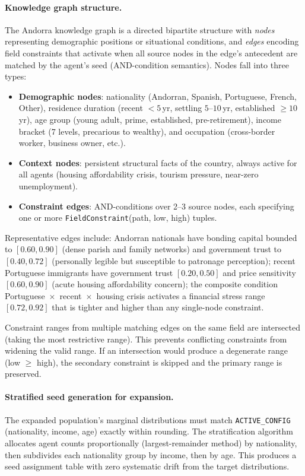 \documentclass[a4paper,12pt]{article}
\begin{document}
\paragraph{Knowledge graph structure.}
The Andorra knowledge graph is a directed bipartite structure with
\emph{nodes} representing demographic positions or situational conditions,
and \emph{edges} encoding field constraints that activate when all source
nodes in the edge's antecedent are matched by the agent's seed
(AND-condition semantics). Nodes fall into three types:

\begin{itemize}
\item \textbf{Demographic nodes}: nationality (Andorran, Spanish, Portuguese,
      French, Other), residence duration (recent $<5$\,yr, settling $5$--$10$\,yr,
      established $\geq10$\,yr), age group (young adult, prime, established,
      pre-retirement), income bracket (7 levels, precarious to wealthy),
      and occupation (cross-border worker, business owner, etc.).
\item \textbf{Context nodes}: persistent structural facts of the country,
      always active for all agents (housing affordability crisis, tourism
      pressure, near-zero unemployment).
\item \textbf{Constraint edges}: AND-conditions over 2--3 source nodes,
      each specifying one or more \texttt{FieldConstraint}(path, low, high)
      tuples.
\end{itemize}

Representative edges include: Andorran nationals have bonding capital
bounded to $[0.60, 0.90]$ (dense parish and family networks) and government
trust to $[0.40, 0.72]$ (personally legible but susceptible to patronage
perception); recent Portuguese immigrants have government trust $[0.20, 0.50]$
and price sensitivity $[0.60, 0.90]$ (acute housing affordability concern);
the composite condition Portuguese~$\times$~recent~$\times$~housing crisis
activates a financial stress range $[0.72, 0.92]$ that is tighter and higher
than any single-node constraint.

Constraint ranges from multiple matching edges on the same field are
intersected (taking the most restrictive range). This prevents conflicting
constraints from widening the valid range. If an intersection would produce
a degenerate range (low $\geq$ high), the secondary constraint is skipped
and the primary range is preserved.

\paragraph{Stratified seed generation for expansion.}
The expanded population's marginal distributions must match \texttt{ACTIVE\_CONFIG}
(nationality, income, age) exactly within rounding. The stratification
algorithm allocates agent counts proportionally (largest-remainder method)
by nationality, then subdivides each nationality group by income, then by
age. This produces a seed assignment table with zero systematic drift from
the target distributions.
\end{document}
